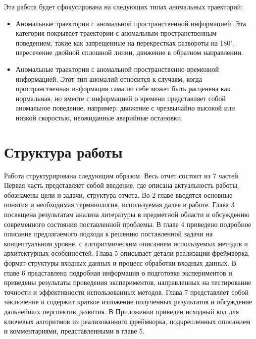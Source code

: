 Эта работа будет сфокусирована на следующих типах аномальных траекторий:

\begin{itemize}
	\setlength\itemsep{-0.5em}
	\item Аномальные траектории с аномальной пространственной информацией. Эта категория покрывает траектории с аномальным пространственным поведением, такие как запрещенные на перекрестках развороты на 180$^{\circ}$, пересечение двойной сплошной линии, движение в обратном направлении.
	\item Аномальные траектории с аномальной пространственно-временной информацией. Этот тип аномалий относится к случаям, когда пространственная информация сама по себе может быть расценена как нормальная, но вместе с информацией о времени представляет собой аномальное поведение, например: движение с чрезвычайно высокой или низкой скоростью, неожиданные аварийные остановки.
\end{itemize}

\section{Структура работы}

Работа структурирована следующим образом. Весь отчет состоит из 7 частей. Первая часть представляет собой введение, где описана актуальность работы, обозначены цели и задачи, структура отчета. Во 2 главе вводятся основные понятия и необходимая терминология, используемая далее в работе. Глава 3 посвящена результатам анализа литературы в предметной области и обсуждению современного состояния поставленной проблемы. В главе 4 приведено подробное описание предлагаемого подхода к решению поставленной задачи на концептуальном уровне, с алгоритмическим описанием используемых методов и архитектурных особенностей. Глава 5 описывает детали реализации фреймворка, формат структуры входных данных и процесс обработки входных данных. В главе 6 представлена подробная информация о подготовке экспериментов и приведены результаты проведения экспериментов, направленных на тестирование точности и эффективности использованных методов. Глава 7 представляет собой заключение и содержит краткое изложение полученных результатов и обсуждение дальнейших перспектив развития. В Приложении приведен исходный код для ключевых алгоритмов из реализованного фреймворка, подкрепленных описанием и комментариями, представленными в главе 5.